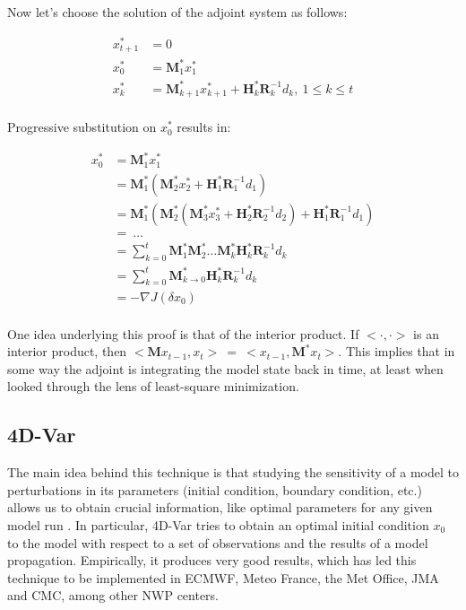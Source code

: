 \documentclass{article}
\begin{document}
Now let's choose the solution of the adjoint system as follows:

\begin{align*}
x_{t + 1}^*  &= 0 \\
x_0^*  &= \mathbf{M}_1^* x_1^* \\
x_k^*  &= \mathbf{M}_{k + 1}^* x_{k + 1}^* + \mathbf{H}_k^* \mathbf{R}_k^{-1} d_k, \: 1 \leq k \leq t \\
\end{align*}

Progressive substitution on $x_0^*$ results in:

\begin{align*}
x_0^*  &= \mathbf{M}_1^* x_1^* \\
&= \mathbf{M}_1^* (\mathbf{M}_2^* x_2^* + \mathbf{H}_1^* \mathbf{R}_1^{-1} d_1) \\
&= \mathbf{M}_1^* (\mathbf{M}_2^* (\mathbf{M}_3^* x_3^* + \mathbf{H}_2^* \mathbf{R}_2^{-1} d_2) + \mathbf{H}_1^* \mathbf{R}_1^{-1} d_1) \\
&= \: \dots \\
&= \sum_{k = 0}^t \mathbf{M}_1^* \mathbf{M}_2^* \dots \mathbf{M}_k^* \mathbf{H}_k^* \mathbf{R}_k^{-1} d_k \\
&= \sum_{k = 0}^t \mathbf{M}_{k \rightarrow 0}^* \mathbf{H}_k^* \mathbf{R}_k^{-1} d_k \\
&= - \nabla J(\delta x_0) \\
\end{align*}

One idea underlying this proof is that of the interior product. If $<\cdot, \cdot>$ is an interior product, then $<\mathbf{M} x_{t - 1}, x_t> \: = \: <x_{t - 1}, \mathbf{M}^* x_t>$. This implies that in some way the adjoint is integrating the model state back in time, at least when looked through the lens of least-square minimization. \\

\subsection{4D-Var}

The main idea behind this technique is that studying the sensitivity of a model to perturbations in its parameters (initial condition, boundary condition, etc.) allows us to obtain crucial information, like optimal parameters for any given model run \cite{Benedetti2014}. In particular, 4D-Var tries to obtain an optimal initial condition $x_0$ to the model with respect to a set of observations and the results of a model propagation. Empirically, it produces very good results, which has led this technique to be implemented in ECMWF, Meteo France, the Met Office, JMA and CMC, among other NWP centers. \\
\end{document}
